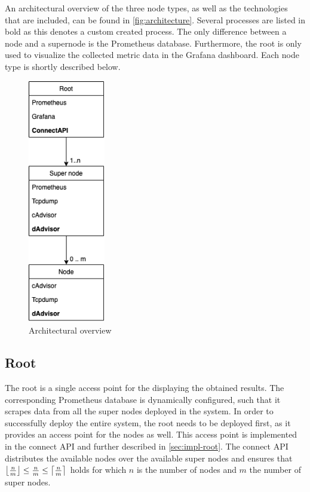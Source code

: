 \noindent
An architectural overview of the three node types, as well as the technologies that are included, can be found in \autoref{fig:architecture}. Several processes are listed in bold as this denotes a custom created process. The only difference between a node and a supernode is the Prometheus database. Furthermore, the root is only used to visualize the collected metric data in the Grafana dashboard. Each node type is shortly described below.

\begin{figure}
    \centering
    \includegraphics[width=0.3\textwidth]{gfx/architecture.png}
    \caption{Architectural overview}
    \label{fig:architecture}
\end{figure}

\subsection{Root} \label{sec:root}
The root is a single access point for the displaying the obtained results. The corresponding Prometheus database is dynamically configured, such that it scrapes data from all the super nodes deployed in the system. 
In order to successfully deploy the entire system, the root needs to be deployed first, as it provides an access point for the nodes as well. This access point is implemented in the connect API and further described in \autoref{sec:impl-root}. The connect API distributes the available nodes over the available super nodes and ensures that $\floor*{\frac{n}{m}} \leq \frac{n}{m} \leq \ceil*{\frac{n}{m}}$ holds for which $n$ is the number of nodes and $m$ the number of super nodes.

